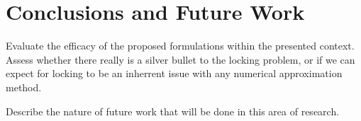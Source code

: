 \chapter{Conclusions and Future Work}
%
Evaluate the efficacy of the proposed formulations within the presented context. Assess whether there really is a silver bullet to the locking problem, or if we can expect for locking to be an inherrent issue with any numerical approximation method.

Describe the nature of future work that will be done in this area of research.
